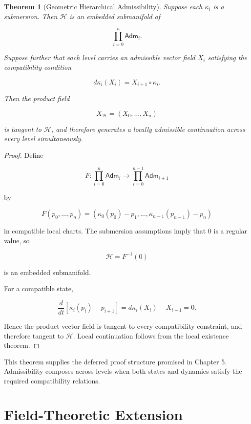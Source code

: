 \documentclass[11pt,oneside]{book}
\numberwithin{equation}{chapter}
\theoremstyle{definition}
\theoremstyle{plain}
\newtheorem{theorem}[definition]{Theorem}
\newcommand{\Adm}{\mathsf{Adm}}
\begin{document}
\begin{theorem}[Geometric Hierarchical Admissibility]

Suppose each \(\kappa_i\) is a submersion. Then \(\mathcal H\) is an embedded
submanifold of

\[
\prod_{i=0}^{n}\Adm_i.
\]

Suppose further that each level carries an admissible vector field \(X_i\)
satisfying the compatibility condition

\[
d\kappa_i(X_i)
=
X_{i+1}\circ\kappa_i.
\]

Then the product field

\[
X_{\mathcal H}
=
(X_0,\ldots,X_n)
\]

is tangent to \(\mathcal H\), and therefore generates a locally admissible
continuation across every level simultaneously.

\end{theorem}

\begin{proof}

Define

\[
F:
\prod_{i=0}^{n}\Adm_i
\longrightarrow
\prod_{i=0}^{n-1}\Adm_{i+1}
\]

by

\[
F(p_0,\ldots,p_n)
=
\left(
\kappa_0(p_0)-p_1,
\ldots,
\kappa_{n-1}(p_{n-1})-p_n
\right)
\]

in compatible local charts. The submersion assumptions imply that \(0\) is
a regular value, so

\[
\mathcal H
=
F^{-1}(0)
\]

is an embedded submanifold.

For a compatible state,

\[
\frac{d}{dt}
\left[
\kappa_i(p_i)-p_{i+1}
\right]
=
d\kappa_i(X_i)-X_{i+1}
=
0.
\]

Hence the product vector field is tangent to every compatibility constraint,
and therefore tangent to \(\mathcal H\). Local continuation follows from the
local existence theorem.

\end{proof}

This theorem supplies the deferred proof structure promised in Chapter 5.
Admissibility composes across levels when both states and dynamics satisfy
the required compatibility relations.

\section{Field-Theoretic Extension}
\end{document}
